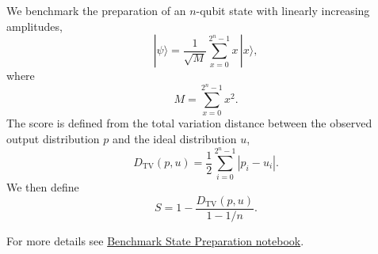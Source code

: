 We benchmark the preparation of an \(n\)-qubit state with linearly increasing amplitudes,
\[
|\psi\rangle = \frac{1}{\sqrt{M}} \sum_{x=0}^{2^n-1} x \, |x\rangle ,
\]
where
\[
M = \sum_{x=0}^{2^n-1} x^2 .
\]
The score is defined from the total variation distance between the observed output distribution \(p\) and the ideal distribution \(u\),
\[
D_{\mathrm{TV}}(p,u) = \frac{1}{2}\sum_{i=0}^{2^n-1} |p_i-u_i| .
\]
We then define
\[
S = 1 - \frac{D_{\mathrm{TV}}(p,u)}{1-1/n}.
\]
\smallskip

For more details see \href{https://github.com/softqlib/softqlib-quantum-algorithms/tree/main/benchmarking/benchmarks/benchmark\_state\_preparation.ipynb}{Benchmark State Preparation notebook}.
\medskip
